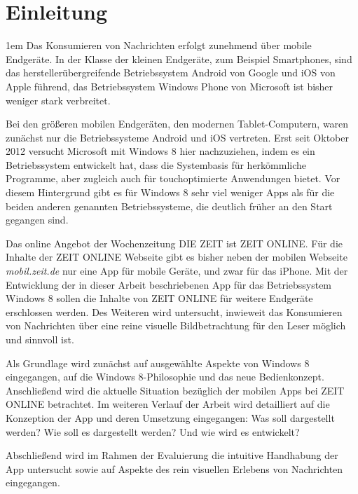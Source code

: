 \documentclass[12pt,a4paper,bibtotoc,abstracton]{scrartcl}
\begin{document}
\pagestyle{headings}


\newpage
{}
\setcounter{page}{1}
\section{Einleitung}
\label{sec:einleitung}
\parindent1em
Das Konsumieren von Nachrichten erfolgt zunehmend über mobile Endgeräte. 
In der Klasse der kleinen Endgeräte, zum Beispiel Smartphones, sind das herstellerübergreifende  Betriebssystem Android von Google und iOS von Apple führend, das Betriebssystem Windows Phone von Microsoft ist bisher weniger stark verbreitet.

Bei den größeren mobilen Endgeräten, den modernen Tablet-Computern, waren zunächst nur die Betriebssysteme Android und iOS vertreten. Erst seit Oktober 2012 versucht Microsoft mit Windows 8 hier nachzuziehen, indem es ein Betriebssystem entwickelt hat, dass die Systembasis für herkömmliche Programme, aber zugleich auch für touchoptimierte Anwendungen bietet. Vor diesem Hintergrund gibt es für Windows 8 sehr viel weniger Apps als für die beiden anderen genannten Betriebssysteme, die deutlich früher an den Start gegangen sind.

Das online Angebot der Wochenzeitung DIE ZEIT ist ZEIT ONLINE. 
Für die Inhalte der ZEIT ONLINE Webseite gibt es bisher neben der mobilen Webseite \textit{mobil.zeit.de} nur eine App für mobile Geräte, und zwar für das iPhone. Mit der Entwicklung der in dieser Arbeit beschriebenen App für das Betriebssystem Windows 8 sollen die Inhalte von ZEIT ONLINE für weitere Endgeräte erschlossen werden. Des Weiteren wird untersucht, inwieweit das Konsumieren von Nachrichten über eine reine visuelle  Bildbetrachtung für den Leser möglich und sinnvoll ist. 

Als Grundlage wird zunächst auf ausgewählte Aspekte von Windows 8 eingegangen, auf die Windows 8-Philosophie und das neue Bedienkonzept. Anschließend wird die aktuelle Situation bezüglich der mobilen Apps bei ZEIT ONLINE betrachtet. Im weiteren Verlauf der Arbeit wird detailliert auf die Konzeption der App und deren Umsetzung eingegangen: Was soll dargestellt werden? Wie soll es dargestellt werden? Und wie wird es entwickelt?

Abschließend wird im Rahmen der Evaluierung die intuitive Handhabung der App untersucht sowie auf Aspekte des rein visuellen Erlebens von Nachrichten eingegangen.



\newpage
\end{document}
